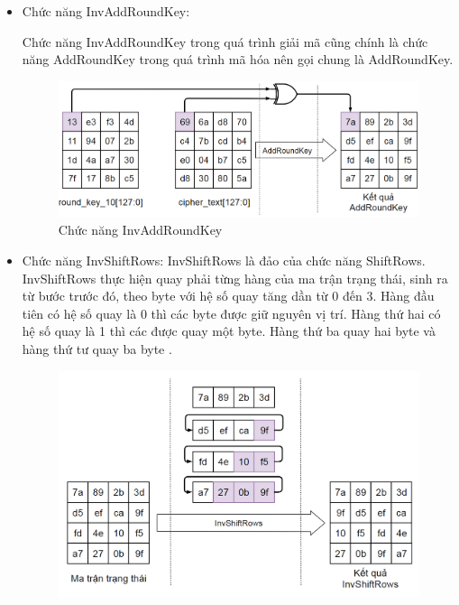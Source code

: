 \begin{itemize}
    \item Chức năng InvAddRoundKey:

    Chức năng InvAddRoundKey trong quá trình giải mã cũng chính là chức năng AddRoundKey trong quá trình mã hóa nên gọi chung là AddRoundKey.\cite{b3}

    \begin{figure}[H]
    \centering
    \includegraphics[scale=0.4]{pic/huê/Chức năng AddRoundKey đảo.png}
    
    
    \caption{Chức năng InvAddRoundKey}
\end{figure}
\item Chức năng InvShiftRows:
InvShiftRows là đảo của chức năng ShiftRows. InvShiftRows thực hiện quay phải từng hàng của ma trận trạng thái, sinh ra từ bước trước đó, theo byte với hệ số quay tăng dần từ 0 đến 3. Hàng đầu tiên có hệ số quay là 0 thì các byte được giữ nguyên vị trí. Hàng thứ hai có hệ số quay là 1 thì các được quay một byte. Hàng thứ ba quay hai byte và hàng thứ tư quay ba byte \cite{fips2001197}.
\begin{figure}[H]
    \centering
    \includegraphics[scale=0.4]{pic/huê/Chức năng InvShiftRows.png}
    

\end{figure}
\end{itemize}
